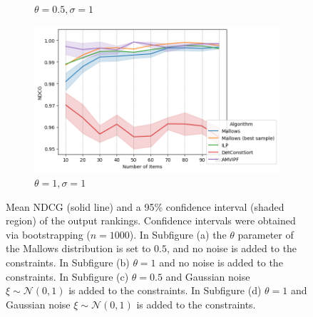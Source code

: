 \begin{figure}
\begin{subfigure}[b]{0.4\textwidth}
         \caption{$\theta = 0.5, \sigma=1$}
         \label{fig:01ndcg}
     \end{subfigure}\quad
     \begin{subfigure}[b]{0.4\textwidth}
         \centering
         \includegraphics[width=\textwidth]{resources/11/ndcg.png}
         \caption{$\theta = 1, \sigma=1$}
         \label{fig:11ndcg}
     \end{subfigure}\quad
  \caption{
  Mean NDCG (solid line) and a 95\% confidence interval (shaded region) of the output rankings. Confidence intervals were obtained via bootstrapping ($n=1000$). In Subfigure (a) the $\theta$ parameter of the Mallows distribution is set to $0.5$, and no noise is added to the constraints. In Subfigure (b) $\theta=1$ and no noise is added to the constraints. In Subfigure (c) $\theta=0.5$ and Gaussian noise $\xi\sim \mathcal{N}(0,1)$ is added to the constraints. In Subfigure  (d) $\theta=1$ and Gaussian noise $\xi\sim \mathcal{N}(0,1)$ is added to the constraints.  }
  \label{plot:ndcg}
\end{figure}


